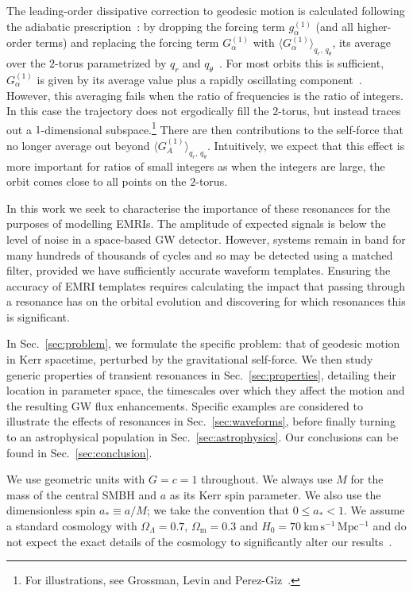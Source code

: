 \documentclass[aps,prd,amsfonts,amssymb,amsmath,nofootinbib,showpacs,superscriptaddress,twocolumn,floatfix]{revtex4-1}
\newcommand{\secref}[1]{Sec.~\ref{sec:#1}}
\newcommand{\units}[1]{\ensuremath{~\mathrm{#1}}}
\newcommand{\sub}[1]{\ensuremath{_\mathrm{#1}}}
\begin{document}
The leading-order dissipative correction to geodesic motion is calculated following the adiabatic prescription~\cite{Hinderer2008}: by dropping the forcing term $g_\alpha^{(1)}$ (and all higher-order terms) and replacing the forcing term $G_\alpha^{(1)}$ with $\langle G_\alpha^{(1)}\rangle_{q_r,\,q_\theta}$, its average over the $2$-torus parametrized by $q_r$ and $q_\theta$~\cite{Drasco2005}. For most orbits this is sufficient, $G_\alpha^{(1)}$ is given by its average value plus a rapidly oscillating component~\cite{Arnold1988}. %
However, this averaging fails when the ratio of frequencies is the ratio of integers. In this case the trajectory does not ergodically fill the $2$-torus, but instead traces out a $1$-dimensional subspace.\footnote{For illustrations, see Grossman, Levin and Perez-Giz~\cite{Grossman2012}.} There are then contributions to the self-force that no longer average out beyond $\langle G_A^{(1)}\rangle_{q_r,\,q_\theta}$. Intuitively, we expect that this effect is more important for ratios of small integers as when the integers are large, the orbit comes close to all points on the $2$-torus.

In this work we seek to characterise the importance of these resonances for the purposes of modelling EMRIs. The amplitude of expected signals is below the level of noise in a space-based GW detector. However, systems remain in band for many hundreds of thousands of cycles and so may be detected using a matched filter, provided we have sufficiently accurate waveform templates. Ensuring the accuracy of EMRI templates requires calculating the impact that passing through a resonance has on the orbital evolution and discovering for which resonances this is significant.

In \secref{problem}, we formulate the specific problem: that of geodesic motion in Kerr spacetime, perturbed by the gravitational self-force. We then study generic properties of transient resonances in \secref{properties}, detailing their location in parameter space, the timescales over which they affect the motion and the resulting GW flux enhancements. Specific examples are considered to illustrate the effects of resonances in \secref{waveforms}, before finally turning to an astrophysical population in \secref{astrophysics}. Our conclusions can be found in \secref{conclusion}.

We use geometric units with $G = c = 1$ throughout. We always use $M$ for the mass of the central SMBH and $a$ as its Kerr spin parameter. We also use the dimensionless spin $a_\ast \equiv a/M$; we take the convention that $0 \leq a_\ast < 1$. We assume a standard cosmology with $\Omega_\Lambda = 0.7$, $\Omega\sub{m} = 0.3$ and $H_0 = 70\units{km\, s^{-1}\, Mpc^{-1}}$ and do not expect the exact details of the cosmology to significantly alter our results~\cite{Mapelli2012}.
\end{document}

